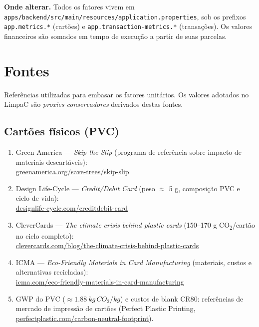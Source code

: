 \documentclass[11pt,a4paper]{article}
\begin{document}
\vspace{0.4cm}
\begin{notebox}
\textbf{Onde alterar.} Todos os fatores vivem em
\texttt{apps/backend/src/main/resources/application.properties}, sob os prefixos
\texttt{app.metrics.*} (cartões) e \texttt{app.transaction-metrics.*} (transações).
Os valores financeiros são somados em tempo de execução a partir de suas parcelas.
\end{notebox}

\section{Fontes}

Referências utilizadas para embasar os fatores unitários. Os valores adotados no
LimpaC são \emph{proxies conservadores} derivados destas fontes.

\subsection{Cartões físicos (PVC)}
\begin{enumerate}[leftmargin=1.6em]
\item Green America --- \emph{Skip the Slip} (programa de referência sobre
impacto de materiais descartáveis):\\
\href{https://greenamerica.org/save-trees/skip-slip}{greenamerica.org/save-trees/skip-slip}
\item Design Life-Cycle --- \emph{Credit/Debit Card} (peso $\approx$ 5 g,
composição PVC e ciclo de vida):\\
\href{http://www.designlife-cycle.com/creditdebit-card}{designlife-cycle.com/creditdebit-card}
\item CleverCards --- \emph{The climate crisis behind plastic cards}
(150--170 g CO\textsubscript{2}/cartão no ciclo completo):\\
\href{https://www.clevercards.com/blog/the-climate-crisis-behind-plastic-cards}{clevercards.com/blog/the-climate-crisis-behind-plastic-cards}
\item ICMA --- \emph{Eco-Friendly Materials in Card Manufacturing}
(materiais, custos e alternativas recicladas):\\
\href{https://icma.com/eco-friendly-materials-in-card-manufacturing}{icma.com/eco-friendly-materials-in-card-manufacturing}
\item GWP do PVC ($\approx \SI{1.88}{kg\,CO_2/kg}$) e custos de blank CR80:
referências de mercado de impressão de cartões (Perfect Plastic Printing,
\href{https://perfectplastic.com/carbon-neutral-footprint/}{perfectplastic.com/carbon-neutral-footprint}).
\end{enumerate}
\end{document}

